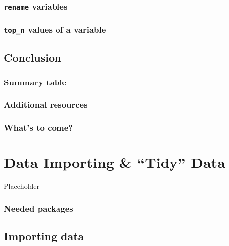 \documentclass[
  12pt, krantz2,
]{krantz}
\begin{document}
\hypertarget{rename}{%
\subsection{\texorpdfstring{\texttt{rename} variables}{rename variables}}\label{rename}}

\hypertarget{top_n-values-of-a-variable}{%
\subsection{\texorpdfstring{\texttt{top\_n} values of a variable}{top\_n values of a variable}}\label{top_n-values-of-a-variable}}

\hypertarget{conclusion-2}{%
\section{Conclusion}\label{conclusion-2}}

\hypertarget{summary-table-1}{%
\subsection{Summary table}\label{summary-table-1}}

\hypertarget{additional-resources-2}{%
\subsection{Additional resources}\label{additional-resources-2}}

\hypertarget{whats-to-come-1}{%
\subsection{What's to come?}\label{whats-to-come-1}}

\hypertarget{tidy}{%
\chapter{Data Importing \& ``Tidy'' Data}\label{tidy}}

Placeholder

\hypertarget{needed-packages-2}{%
\subsection*{Needed packages}\label{needed-packages-2}}


\hypertarget{csv}{%
\section{Importing data}\label{csv}}
\end{document}
